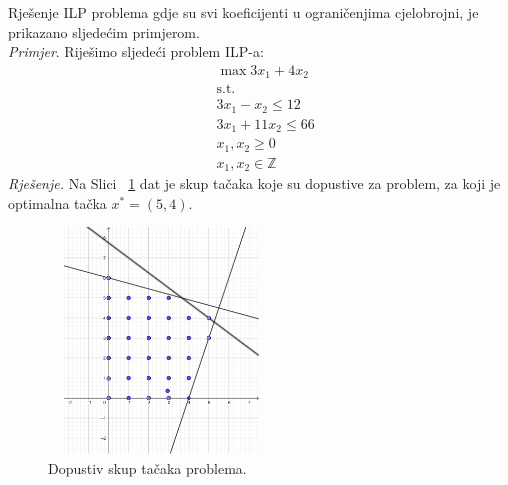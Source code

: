 \documentclass[a4paper, utf8, 11pt, colorlinks]{book}
\begin{document}
Rješenje ILP problema gdje su svi koeficijenti u ograničenjima cjelobrojni, je prikazano sljedećim primjerom. \\
\emph{Primjer}. Riješimo sljedeći problem ILP-a:
\begin{align*}
    &\max 3 x_1 + 4 x_2 \\
    &\mbox{s.t.} \\
    & 3 x_1 - x_2 \leq 12 \\
    & 3 x_1 + 11 x_2 \leq 66 \\
    & x_1, x_2 \geq 0 \\
    & x_1, x_2 \in \mathbb{Z}
\end{align*}
\emph{Rješenje. }
Na Slici~ \ref{fig:region_ilp_primjer_2} dat je skup tačaka koje su dopustive za problem, za koji je optimalna tačka $x^*=(5,4)$.
\begin{figure}
    \centering
    \includegraphics[width=170pt,height=170pt]{region_ilp_primjer_2.eps}
    \caption{Dopustiv skup tačaka problema.}
    \label{fig:region_ilp_primjer_2}
\end{figure}
\end{document}
